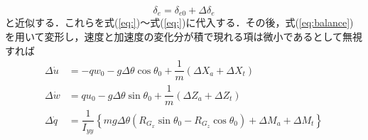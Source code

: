 \begin{equation}
  \delta_e = \delta_{e0} + \Delta \delta_e
\end{equation}
と近似する．これらを式(\ref{eq:})〜式(\ref{eq:})に代入する．その後，式(\ref{eq:balance})を用いて変形し，速度と加速度の変化分が積で現れる項は微小であるとして無視すれば
\begin{align}
  \Delta \dot{u} &= -qw_0 - g\Delta \theta \cos\theta_0 +\dfrac{1}{m}(\Delta X_a + \Delta X_t) \\
  \Delta \dot{w} &= qu_0 - g\Delta \theta \sin \theta_0 +\dfrac{1}{m}(\Delta Z_a + \Delta Z_t) \\
  \Delta \dot{q} &= \dfrac{1}{I_{yy}}\left\{mg\Delta \theta(R_{G_x}\sin\theta_0 - R_{G_z}\cos\theta_0) + \Delta M_a + \Delta M_t\right\}
\end{align}

\subsection{}
